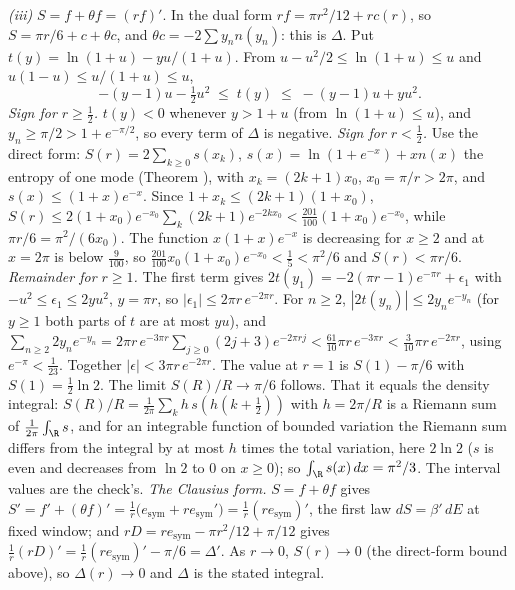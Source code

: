 \emph{(iii)} $S = f + \theta f = (rf)'$. In the dual form $rf = \pi r^{2}/12 + rc(r)$, so $S = \pi r/6 + c + \theta c$, and $\theta c = -2\sum y_{n}n(y_{n})$: this is $\Delta$. Put $t(y) = \ln(1 + u) - yu/(1 + u)$. From $u - u^{2}/2 \le \ln(1 + u) \le u$ and $u(1 - u) \le u/(1 + u) \le u$,
\[
-(y - 1)u - \tfrac12u^{2} \;\le\; t(y) \;\le\; -(y - 1)u + yu^{2} .
\]
\emph{Sign for $r \ge \tfrac12$.} $t(y) < 0$ whenever $y > 1 + u$ (from $\ln(1 + u) \le u$), and $y_{n} \ge \pi/2 > 1 + e^{-\pi/2}$, so every term of $\Delta$ is negative. \emph{Sign for $r < \tfrac12$.} Use the direct form: $S(r) = 2\sum_{k \ge 0}s(x_{k})$, $s(x) = \ln(1 + e^{-x}) + xn(x)$ the entropy of one mode (Theorem ), with $x_{k} = (2k + 1)x_{0}$, $x_{0} = \pi/r > 2\pi$, and $s(x) \le (1 + x)e^{-x}$. Since $1 + x_{k} \le (2k + 1)(1 + x_{0})$, $S(r) \le 2(1 + x_{0})e^{-x_{0}}\sum_{k}(2k + 1)e^{-2kx_{0}} < \tfrac{201}{100}(1 + x_{0})e^{-x_{0}}$, while $\pi r/6 = \pi^{2}/(6x_{0})$. The function $x(1 + x)e^{-x}$ is decreasing for $x \ge 2$ and at $x = 2\pi$ is below $\tfrac{9}{100}$, so $\tfrac{201}{100}x_{0}(1 + x_{0})e^{-x_{0}} < \tfrac15 < \pi^{2}/6$ and $S(r) < \pi r/6$. \emph{Remainder for $r \ge 1$.} The first term gives $2t(y_{1}) = -2(\pi r - 1)e^{-\pi r} + \epsilon_{1}$ with $-u^{2} \le \epsilon_{1} \le 2yu^{2}$, $y = \pi r$, so $|\epsilon_{1}| \le 2\pi r\,e^{-2\pi r}$. For $n \ge 2$, $|2t(y_{n})| \le 2y_{n}e^{-y_{n}}$ (for $y \ge 1$ both parts of $t$ are at most $yu$), and $\sum_{n \ge 2}2y_{n}e^{-y_{n}} = 2\pi r\,e^{-3\pi r}\sum_{j \ge 0}(2j + 3)e^{-2\pi rj} < \tfrac{61}{10}\pi r\,e^{-3\pi r} < \tfrac{3}{10}\pi r\,e^{-2\pi r}$, using $e^{-\pi} < \tfrac{1}{23}$. Together $|\epsilon| < 3\pi r\,e^{-2\pi r}$. The value at $r = 1$ is $S(1) - \pi/6$ with $S(1) = \tfrac12\ln 2$. The limit $S(R)/R \to \pi/6$ follows. That it equals the density integral: $S(R)/R = \tfrac{1}{2\pi}\sum_{k}h\,s(h(k + \tfrac12))$ with $h = 2\pi/R$ is a Riemann sum of $\tfrac{1}{2\pi}\int_{\R}s$, and for an integrable function of bounded variation the Riemann sum differs from the integral by at most $h$ times the total variation, here $2\ln 2$ ($s$ is even and decreases from $\ln 2$ to $0$ on $x \ge 0$); so $\int_{\R}s(x)\,dx = \pi^{2}/3$. The interval values are the check's. \emph{The Clausius form.} $S = f + \theta f$ gives $S' = f' + (\theta f)' = \tfrac1r\bigl(e_{\mathrm{sym}} + re_{\mathrm{sym}}'\bigr) = \tfrac1r(re_{\mathrm{sym}})'$, the first law $dS = \beta'\,dE$ at fixed window; and $rD = re_{\mathrm{sym}} - \pi r^{2}/12 + \pi/12$ gives $\tfrac1r(rD)' = \tfrac1r(re_{\mathrm{sym}})' - \pi/6 = \Delta'$. As $r \to 0$, $S(r) \to 0$ (the direct-form bound above), so $\Delta(r) \to 0$ and $\Delta$ is the stated integral.

